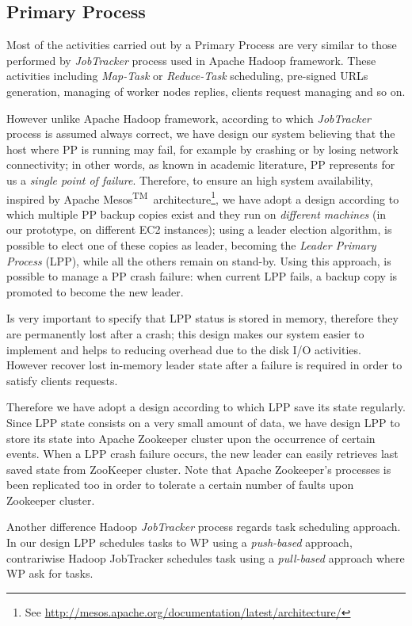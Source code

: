 \documentclass[sigchi]{acmart}
\begin{document}
\subsection{Primary Process}

Most of the activities carried out by a Primary Process are very similar to those performed by \textit{JobTracker} process used in Apache Hadoop framework. These activities including \textit{Map-Task} or \textit{Reduce-Task} scheduling, pre-signed URLs generation, managing of worker nodes replies, clients request managing and so on.

However unlike Apache Hadoop framework, according to which \textit{JobTracker} process is assumed always correct, we have design our system believing that the host where PP is running may fail, for example by crashing or by losing network connectivity; in other words, as known in academic literature, PP represents for us a \textit{single point of failure}. Therefore, to ensure an high system availability, inspired by Apache Mesos\textsuperscript{TM}\ architecture\footnote{See \url{http://mesos.apache.org/documentation/latest/architecture/}}, we have adopt a design according to which multiple PP backup copies exist and they run on \textit{different machines} (in our prototype, on different EC2 instances); using a leader election algorithm, is possible to elect one of these copies as leader, becoming the \textit{Leader Primary Process} (LPP), while all the others remain on stand-by. Using this approach, is possible to manage a PP crash failure: when current LPP fails, a backup copy is promoted to become the new leader. 

Is very important to specify that LPP status is stored in memory, therefore they are permanently lost after a crash; this design makes our system easier to implement and helps to reducing overhead due to the disk I/O activities. However recover lost in-memory leader state after a failure is required in order to satisfy clients requests. 

Therefore we have adopt a design according to which LPP save its state regularly. Since LPP state consists on a very small amount of data, we have design LPP to store its state into Apache Zookeeper cluster upon the occurrence of certain events. When a LPP crash failure occurs, the new leader can easily retrieves last saved state from  ZooKeeper cluster. Note that Apache Zookeeper's processes is been replicated too in order to tolerate a certain number of faults upon Zookeeper cluster.

Another difference Hadoop \textit{JobTracker} process regards task scheduling approach. In our design LPP schedules tasks to WP using a \textit{push-based} approach, contrariwise Hadoop JobTracker schedules task using a \textit{pull-based} approach where WP ask for tasks\cite{LARTS}.
\end{document}
